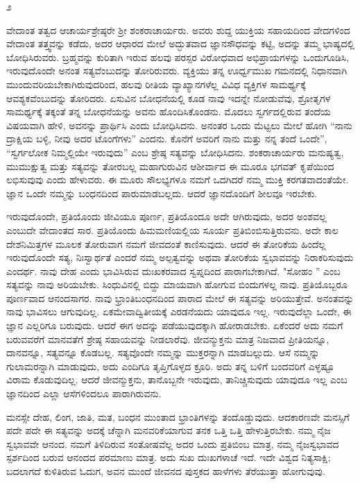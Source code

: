\begin{center}
೨
\end{center}

ವೇದಾಂತ ತತ್ವದ ಆಚಾರ್ಯಶ್ರೇಷ್ಠರೇ ಶ‍್ರೀ ಶಂಕರಾಚಾರ್ಯರು. ಅವರು ಶುದ್ದ ಯುಕ್ತಿಯ ಸಹಾಯದಿಂದ ವೇದಗಳಿಂದ ವೇದಾಂತ ತತ್ತ್ವವನ್ನು ಕಡೆದು, ಅದರ ಆಧಾರದ ಮೇಲೆ ಅದ್ಭುತವಾದ ಜ್ಞಾನಸೌಧವನ್ನು ಕಟ್ಟಿ, ಅದನ್ನು ತಮ್ಮ ಭಾಷ್ಯದಲ್ಲಿ ಬೋಧಿಸಿರುವರು. ಬ್ರಹ್ಮವನ್ನು ಕುರಿತಾಗಿ ಇರುವ ಹಲವು ಪರಸ್ಪರ ವಿರೋಧವಾದ ಅಭಿಪ್ರಾಯಗಳನ್ನು ಒಂದುಗೂಡಿಸಿ, ಇರುವುದೊಂದೇ ಅನಂತ ಸತ್ಯವೆಂಬುದನ್ನು ತೋರಿರುವರು. ವ್ಯಕ್ತಿಯು ತನ್ನ ಊರ್ಧ್ವಮುಖ ಗಮನದಲ್ಲಿ ನಿಧಾನವಾಗಿ ಮುಂದುವರಿಯಬೇಕಾಗಿರುವುದರಿಂದ, ಹಲವು ರೀತಿಯ ವ್ಯಾಖ್ಯಾನಗಳೆಲ್ಲ ವಿವಿಧ ವ್ಯಕ್ತಿಗಳ ಸಾಮರ್ಥ್ಯಕ್ಕೆ ಆವಶ್ಯಕವೆಂಬುದನ್ನು ತೋರಿದರು. ಏಸುವಿನ ಬೋಧನೆಯಲ್ಲಿ ಕೂಡ ನಾವು ಇದನ್ನೇ ನೋಡುವೆವು, ಶ್ರೋತೃಗಳ ಸಾಮರ್ಥ್ಯಕ್ಕೆ ತಕ್ಕಂತೆ ತನ್ನ ಬೋಧನೆಯನ್ನು ಅವನು ಹೊಂದಿಸಿಕೊಂಡನು. ಮೊದಲು ಸ್ವರ್ಗದಲ್ಲಿರುವ ತಂದೆಯ ವಿಷಯವಾಗಿ ಹೇಳಿ, ಅವನನ್ನು ಪ್ರಾರ್ಥಿಸಿ ಎಂದು ಬೋಧಿಸಿದನು. ಅನಂತರ ಒಂದು ಮೆಟ್ಟಲು ಮೇಲೆ ಹೋಗಿ “ನಾನು ದ್ರಾಕ್ಷಿಯ ಬಳ್ಳಿ, ನೀವು ಅದರ ಟೊಂಗೆಗಳು'' ಎಂದನು. ಕೊನೆಗೆ ಅವರಿಗೆ ನಾನು ಮತ್ತು ನನ್ನ ತಂದೆ ಒಂದೇ”, “ಸ್ವರ್ಗಲೋಕ ನಿಮ್ಮಲ್ಲಿಯೇ ಇರುವುದು'' ಎಂಬ ಶ್ರೇಷ್ಠ ಸತ್ಯವನ್ನು ಬೋಧಿಸಿದನು. ಶಂಕರಾಚಾರ್ಯರು ಮನುಷ್ಯತ್ವ, ಮುಮುಕ್ಷುತ್ವ ಮತ್ತು ಸತ್ಯವನ್ನು ತೋರಬಲ್ಲ ಮಹಾಗುರುವಿನ ಆಶೀರ್ವಾದ ಈ ಮೂರೂ ಭಗವತ್ ಕೃಪೆಯಿಂದ ಲಭಿಸುವುವು ಎಂದು ಹೇಳುವರು. ಈ ಮೂರು ಸೌಲಭ್ಯಗಳೂ ನಮಗೆ ಒದಗಿದರೆ ನಮ್ಮ ಮುಕ್ತಿ ಕರಗತವಾದಂತೆಯೇ. ಜ್ಞಾನ ಒಂದೇ ನಮ್ಮನ್ನು ಬಂಧನದಿಂದ ಪಾರುಮಾಡಬಲ್ಲದು. ಆದರೆ ಜ್ಞಾನದೊಂದಿಗೆ ಶೀಲವೂ ಇರಬೇಕು.

ಇರುವುದೊಂದೇ, ಪ್ರತಿಯೊಂದು ಜೀವಿಯೂ ಪೂರ್ಣ, ಪ್ರತಿಯೊಂದೂ ಅದೇ ಆಗಿರುವುದು, ಅದರ ಅಂಶವಲ್ಲ ಎಂಬುದೇ ವೇದಾಂತದ ಸಾರ. ಪ್ರತಿಯೊಂದು ಹಿಮಮಣಿಯಲ್ಲಿಯ ಸೂರ್ಯ ಪ್ರತಿಬಿಂಬಿಸುತ್ತಿರುವನು. ಅದೇ ಕಾಲ ದೇಶನಿಮಿತ್ತಗಳ ಮೂಲಕ ತೋರುವಾಗ ನಮಗೆ ಜೀವದಂತೆ ಕಾಣಿಸುವುದು. ಆದರೆ ಈ ತೋರಿಕೆಯ ಹಿಂದೆಲ್ಲ ಇರುವುದೊಂದೇ ಸತ್ಯ, ನಿಃಸ್ವಾರ್ಥತೆ ಎಂದರೆ ನಮ್ಮ ಅಲ್ಪತ್ವವನ್ನು ಅಥವಾ ತೋರಿಕೆಯ ಸ್ವಭಾವವನ್ನು ನಿರಾಕರಿಸುವುದು ಎಂದರ್ಥ. ನಾವು ದೇಹ ಎಂದು ಭಾವಿಸಿರುವ ದುಃಖಕರವಾದ ಸ್ವಪ್ನದಿಂದ ಪಾರಾಗಬೇಕಾಗಿದೆ. "ಸೋಹಂ '' ಎಂಬ ಸತ್ಯವನ್ನು ನಾವು ಅರಿಯಬೇಕು. ಸಿಂಧುವಿನಲ್ಲಿ ಬಿದ್ದು ಮಾಯವಾಗಿ ಹೋಗುವ ಬಿಂದುಗಳಲ್ಲ ನಾವು. ಪ್ರತಿಯೊಬ್ಬರೂ ಪೂರ್ಣವಾದ ಆನಂದಸಾಗರ. ನಾವು ಭ್ರಾಂತಿಬಂಧನದಿಂದ ಪಾರಾದ ಮೇಲೆ ಈ ಸತ್ಯವನ್ನು ಅರಿಯುತ್ತೇವೆ. ಅನಂತವನ್ನು ನಾವು ಭಾವಿಸಲು ಆಗುವುದಿಲ್ಲ. ಏಕಮೇವಾದ್ವಿತೀಯಕ್ಕೆ ಎರಡನೆಯದು ಯಾವುದೂ ಇಲ್ಲ. ಇರುವುದೆಲ್ಲಾ ಒಂದೇ, ಈ ಜ್ಞಾನ ಎಲ್ಲರಿಗೂ ಬರುವುದು. ಆದರೆ ಈಗ ಅದನ್ನು ಪಡೆಯುವುದಕ್ಕಾಗಿ ಹೋರಾಡಬೇಕು. ಏಕೆಂದರೆ ಅದು ನಮಗೆ ಬರುವವರೆಗೆ ಮಾನವತೆಗೆ ಶ್ರೇಷ್ಠ ಸಹಾಯವನ್ನು ನೀಡಲಾರೆವು. ಜೀವನ್ಮುಕ್ತನು ಮಾತ್ರ ನಿಜವಾದ ಪ್ರೀತಿಯನ್ನೂ, ದಾನವನ್ನೂ, ಸತ್ಯವನ್ನೂ ಕೊಡಬಲ್ಲ. ಸತ್ಯವೊಂದೇ ನಮ್ಮನ್ನು ಮುಕ್ತರನ್ನಾಗಿ ಮಾಡಬಲ್ಲುದು. ಆಸೆ ನಮ್ಮನ್ನು ಗುಲಾಮರನ್ನಾಗಿ ಮಾಡುವುದು, ಅದು ಎಂದಿಗೂ ತೃಪ್ತಿಗೊಳ್ಳದ ಕ್ರೂರಿ. ಅದು ತನ್ನ ಬಳಿಗೆ ಬಂದವರಿಗೆ ಎಳ್ಳಷ್ಟೂ ವಿರಾಮ ಕೊಡುವುದಿಲ್ಲ. ಆದರೆ ಜೀವನ್ಮುಕ್ತನು, ತಾನೊಬ್ಬನೇ ಇರುವುದು, ತಾನಿಚ್ಚಿಸುವುದು ಯಾವುದೂ ಇಲ್ಲ ಎಂಬ ಜ್ಞಾನದಿಂದ ಎಲ್ಲಾ ಆಸೆಗಳಿಂದಲೂ ಪಾರಾಗಿರುವನು.

ಮನಸ್ಸೇ ದೇಹ, ಲಿಂಗ, ಜಾತಿ, ಮತ, ಬಂಧನ ಮುಂತಾದ ಭ್ರಾಂತಿಗಳನ್ನು ತಂದೊಡ್ಡುವುದು. ಆದಕಾರಣವೇ ಮನಸ್ಸಿಗೆ ಪದೇ ಪದೇ ಈ ಸತ್ಯವನ್ನು ಅದಕ್ಕೆ ಚೆನ್ನಾಗಿ ಮನವರಿಕೆಯಾಗುವ ತನಕ ಒತ್ತಿ ಒತ್ತಿ ಹೇಳುತ್ತಿರಬೇಕು. ನಮ್ಮ ನೈಜ ಸ್ವಭಾವವೇ ಆನಂದ. ನಮಗೆ ತಿಳಿದಿರುವ ಸಂತೋಷವೆಲ್ಲ ಅದರ ಒಂದು ಪ್ರತಿಬಿಂಬ ಮಾತ್ರ, ನಮ್ಮ ನೈಜಸ್ವಭಾವದ ಸ್ಪರ್ಶದಿಂದ ಬರುವ ಆನಂದದ ಪರಮಾಣು ಮಾತ್ರ. ಅದು ಸುಖ ದುಃಖಗಳಾಚೆ ಇದೆ. ಇದೇ ವಿಶ್ವದ ನಿತ್ಯಸಾಕ್ಷಿ; ಬದಲಾಗದೆ ಕುಳಿತಿರುವ ಓದುಗ, ಅವನ ಮುಂದೆ ಜೀವನದ ಪುಸ್ತಕದ ಹಾಳೆಗಳು ತೆರೆಯುತ್ತಾ ಹೋಗುವುವು.

